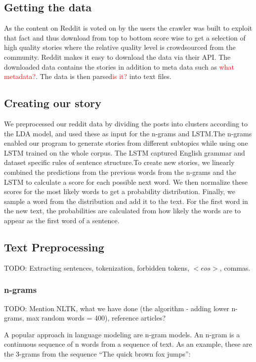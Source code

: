 \documentclass[12pt,a4paper,utf8]{article}
\newcommand\todonote[1]{\textcolor{red}{#1}}
\begin{document}
\subsection{Getting the data}
As the content on Reddit is voted on by the users the crawler was built to exploit that fact and thus download from top to bottom score wise to get a selection of high quality stories where the relative quality level is crowdsourced from the community. Reddit makes it easy to download the data via their API\autocite{redditAPI}. The downloaded data contains the stories in addition to meta data such as \todonote{what metadata?}. The data is then parsed\todonote{is it?} into text files.

\subsection{Creating our story}
We preprocessed our reddit data by dividing the posts into clusters according to the LDA model, and used these as input for the n-grams and LSTM.The n-grams enabled our program to generate stories from different subtopics while using one LSTM trained on the whole corpus. The LSTM captured English grammar and dataset specific rules of sentence structure.To create new stories, we linearly combined the predictions from the previous words from the n-grams and the LSTM to calculate a score for each possible next word. We then normalize these scores for the most likely words to get a probability distribution. Finally, we sample a word from the distribution and add it to the text. For the first word in the new text, the probabilities are calculated from how likely the words are to appear as the first word of a sentence.

\subsection{Text Preprocessing}
TODO: Extracting sentences, tokenization, forbidden tokens, $<eos>$, commas.

\subsubsection{n-grams}
TODO: Mention NLTK, what we have done (the algorithm - adding lower n-grams, max random words = 400), reference articles?

A popular approach in language modeling are n-gram models. An n-gram is a continuous sequence of n words from a sequence of text. As an example, these are the 3-grams from the sequence “The quick brown fox jumps”:
\end{document}

